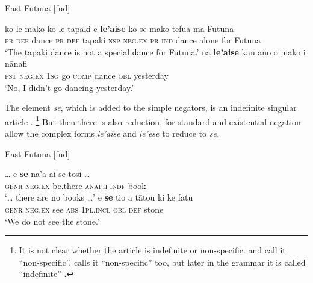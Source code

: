 ﻿\documentclass[output=paper]{langsci/langscibook}
\begin{document}
\begin{exe}\ex\label{ex:int-futuna-dance}
 East Futuna [fud]   
    \begin{xlist}
    \ex\label{ex:int-futuna-dance-special}
    \gll ko  le  mako    ko  le  tapaki  e  \textbf{le'aise}  ko   se
    mako  tefua  ma  Futuna\\
    \textsc{pr}  \textsc{def}  dance    \textsc{pr}  \textsc{def}   tapaki
    \textsc{nsp}  \textsc{neg.ex}  \textsc{pr}    \textsc{ind} dance
    alone     for      Futuna \\
    \glt `The tapaki dance is not a special dance for Futuna.' 
    \ex\label{ex:int-futuna-dance-yesterday}
    \gll  na  \textbf{le'aise}  kau  ano  o  mako  i  nānafi\\
    \textsc{pst}  \textsc{neg.ex}  \textsc{1sg}  go  \textsc{comp}  dance
    \textsc{obl}  yesterday\\
    \glt `No, I didn't go dancing yesterday.'\footnotemark%
    \end{xlist}\end{exe}
%
The element \textit{se}, which is added to the simple negators, is an
indefinite singular article \parencite[122]{MoyseFaurie1999}.%
%
    \footnote{It is not clear whether the article is indefinite or
    non-specific.  \textcite[18]{Mosel1999} and
    \textcite[1363]{Veselinova2014} call it ``non-specific''.
    \textcite[45]{MoyseFaurie1997} calls it ``non-specific'' too, but later
    in the grammar it is called ``indefinite''
    \parencite[88]{MoyseFaurie1997}.} %
%
But then there is also reduction, for
standard and existential negation allow the complex forms \textit{le'aise}
and \textit{le'ese} to reduce to \textit{se.} 
%
\begin{exe}\ex\label{ex:int-futuna-books-stone}
 East Futuna [fud] 
    \begin{xlist}
    \ex\label{ex:int-futuna-books}
    \gll \ldots{} e \textbf{se} na'a ai se tosi \ldots{} \\
{} \textsc{genr} \textsc{neg.ex} be.there \textsc{anaph} \textsc{indf}
book\\
    \glt `\ldots{} there are no books \ldots{}' 
    \ex\label{ex:int-futuna-stone}
    \gll e  \textbf{se}  tio  a  tātou  ki  ke  fatu\\
    \textsc{genr}  \textsc{neg.ex}  see  \textsc{abs}  \textsc{1pl.incl}
    \textsc{obl}  \textsc{def}  stone\\
    \glt `We do not see the stone.'
    \end{xlist}\end{exe}
\end{document}
